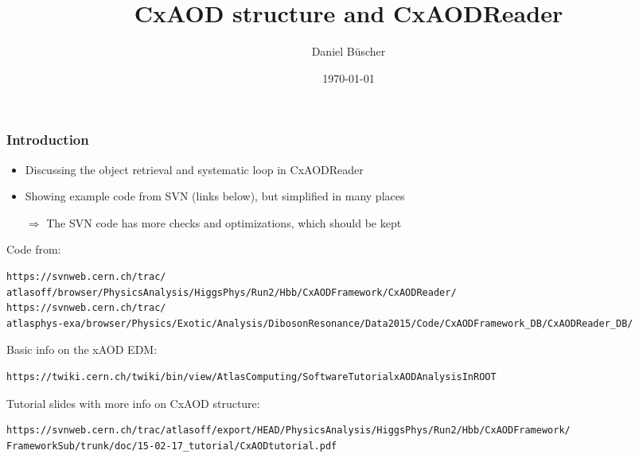 \documentclass{beamer}
\begin{document}

\newcommand{\newImage}[2]{
  \begin{minipage}{#1\textwidth}
  \renewcommand{\_}{_}
  \IfFileExists{#2}
  {\texttt{[image: \#2]}}
  {\centering N/A}
  \renewcommand{\_}{\textunderscore}
    \end{minipage}
}

\title{CxAOD structure and CxAODReader}
\author[Daniel B\"uscher]{
Daniel B\"uscher%
}
\date{\today} 

\frame{\titlepage}

\scriptsize

\begin{frame}[fragile]
\frametitle{Introduction}
\begin{itemize}
 \item Discussing the object retrieval and systematic loop in CxAODReader
 \item Showing example code from SVN (links below), but simplified in many places
 \item[$\Rightarrow$] The SVN code has more checks and optimizations, which should be kept
\end{itemize}
\begin{center}
\end{center}
{\tiny
Code from:
\vspace{-2mm}
\begin{verbatim}
https://svnweb.cern.ch/trac/
atlasoff/browser/PhysicsAnalysis/HiggsPhys/Run2/Hbb/CxAODFramework/CxAODReader/
https://svnweb.cern.ch/trac/
atlasphys-exa/browser/Physics/Exotic/Analysis/DibosonResonance/Data2015/Code/CxAODFramework_DB/CxAODReader_DB/
\end{verbatim}
Basic info on the xAOD EDM:
\vspace{-2mm}
\begin{verbatim}
https://twiki.cern.ch/twiki/bin/view/AtlasComputing/SoftwareTutorialxAODAnalysisInROOT
\end{verbatim}
Tutorial slides with more info on CxAOD structure:
\vspace{-2mm}
\begin{verbatim}
https://svnweb.cern.ch/trac/atlasoff/export/HEAD/PhysicsAnalysis/HiggsPhys/Run2/Hbb/CxAODFramework/
FrameworkSub/trunk/doc/15-02-17_tutorial/CxAODtutorial.pdf
\end{verbatim}
}
\end{frame}
\end{document}
